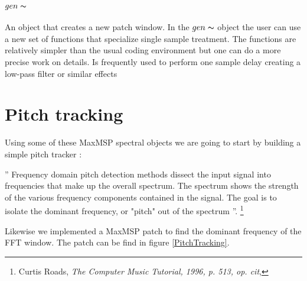 \subsubsection{$gen\thicksim$}
    An object that creates a new patch window. In the $gen\thicksim$ object the user can use a new set of functions that specialize single sample treatment. The functions are relatively simpler than the usual coding environment but one can do a more precise work on details. Is frequently used to perform one sample delay creating a low-pass filter or similar effects

\section{Pitch tracking}

Using some of these MaxMSP spectral objects we are going to start by building a simple pitch tracker :

    \begin{displayquote}
        '' Frequency domain pitch detection methods dissect the input signal into frequencies that make up the overall spectrum. The spectrum shows the strength of the various frequency components contained in the signal. The goal is to isolate the dominant frequency, or "pitch" out of the spectrum ''. \footnote{Curtis Roads, \textit{The Computer Music Tutorial, 1996, p. 513, op. cit}, \nocite{Roads:1996:CMT:525484}}
    \end{displayquote}

Likewise we implemented a MaxMSP patch to find the dominant frequency of the FFT window. The patch can be find in figure \ref{PitchTracking}.


